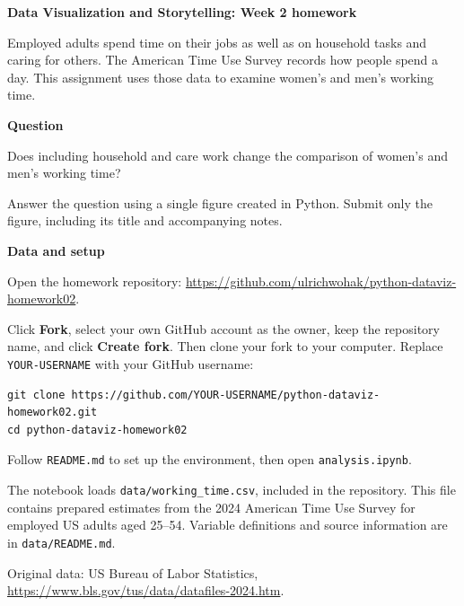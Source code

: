 \documentclass[11pt,a4paper]{article}
\begin{document}
\textbf{Data Visualization and Storytelling: Week 2 homework}

Employed adults spend time on their jobs as well as on household tasks and
caring for others. The American Time Use Survey records how people spend
a day. This assignment uses those data to examine women's and men's
working time.

\textbf{Question}

Does including household and care work change the comparison of women's
and men's working time?

Answer the question using a single figure created in Python. Submit only
the figure, including its title and accompanying notes.

\textbf{Data and setup}

Open the homework repository:\newline
\url{https://github.com/ulrichwohak/python-dataviz-homework02}.

Click \textbf{Fork}, select your own GitHub account as the owner, keep the
repository name, and click \textbf{Create fork}. Then clone your fork to
your computer. Replace \texttt{YOUR-USERNAME} with your GitHub username:

{\small
\begin{verbatim}
git clone https://github.com/YOUR-USERNAME/python-dataviz-homework02.git
cd python-dataviz-homework02
\end{verbatim}
}

Follow \texttt{README.md} to set up the environment, then open
\texttt{analysis.ipynb}.

The notebook loads \texttt{data/working\_time.csv}, included in the repository.
This file contains prepared estimates from the 2024 American Time Use Survey
for employed US adults aged 25--54. Variable definitions and source
information are in \texttt{data/README.md}.

Original data: US Bureau of Labor Statistics,\newline
\url{https://www.bls.gov/tus/data/datafiles-2024.htm}.
\end{document}
